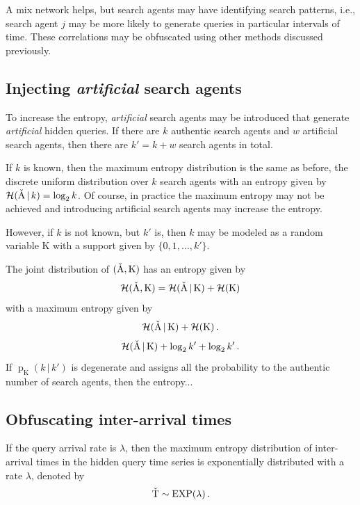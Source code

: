 \documentclass[final,11pt]{article}
\newcommand{\rvhts}[1][]{%
   \ifthenelse{ \equal{#1}{} }
      {\ensuremath{\rv{\check{T}}}}
      {\ensuremath{\rv{\check{T}_{#1}}}}
}
\newcommand{\rvhsa}[1][]{%
   \ifthenelse{ \equal{#1}{} }
      {\ensuremath{\rv{\check{A}}}}
      {\ensuremath{\rv{\check{A}_{#1}}}}
}
\newcommand{\rv}[1]{\mathrm{#1}}
\newcommand{\entropy}{\operatorname{\mathcal{H}}}
\newcommand{\pmf}{\operatorname{p}}
\newcommand{\expdist}{\operatorname{\rm{EXP}}}
\newcommand{\given}{{\,|\,}}
\numberwithin{equation}{section}
\theoremstyle{plain}
\theoremstyle{remark}
\begin{document}
A mix network helps, but search agents may have identifying search patterns, i.e., search agent $j$ may be more likely to generate queries in particular intervals of time. These correlations may be obfuscated using other methods discussed previously.

\subsection{Injecting \emph{artificial} search agents}
To increase the entropy, \emph{artificial} search agents may be introduced that generate \emph{artificial} hidden queries. If there are $k$ authentic search agents and $w$ artificial search agents, then there are $k' = k + w$ search agents in total.

If $k$ is known, then the maximum entropy distribution is the same as before, the discrete uniform distribution over $k$ search agents with an entropy given by $\entropy(\rvhsa \given k) = \log_2 k$. Of course, in practice the maximum entropy may not be achieved and introducing artificial search agents may increase the entropy.

However, if $k$ is not known, but $k'$ is, then $k$ may be modeled as a random variable $\rv{K}$ with a support given by $\{0,1,\ldots,k'\}$.

The joint distribution of $(\rvhsa, \rv{K})$ has an entropy given by
\begin{equation}
    \entropy(\rvhsa, \rv{K}) = \entropy(\rvhsa \given \rv{K}) + \entropy(\rv{K})
\end{equation}
with a maximum entropy given by
\begin{equation}
    \entropy(\rvhsa \given \rv{K}) + \entropy(\rv{K})\,.
\end{equation}
\begin{equation}
    \entropy(\rvhsa \given \rv{K}) + \log_2 k' + \log_2 k'\,.
\end{equation}
If $\pmf_{\rv{K}}(k \given k')$ is degenerate and assigns all the probability to the authentic number of search agents, then the entropy...

\subsection{Obfuscating inter-arrival times}
If the query arrival rate is $\lambda$, then the maximum entropy distribution of inter-arrival times in the hidden query time series is exponentially distributed with a rate $\lambda$, denoted by
\begin{equation}
    \rvhts \sim \expdist(\lambda)\,.
\end{equation}
\end{document}

